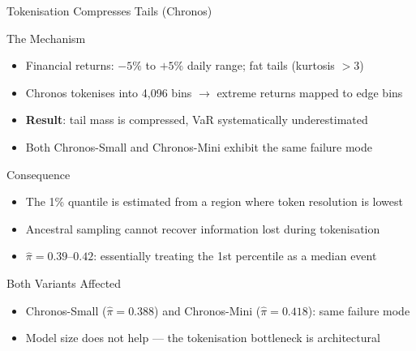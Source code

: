\documentclass[9pt, aspectratio=169, t]{beamer}
\begin{document}
\begin{frame}{Tokenisation Compresses Tails (Chronos)}
	\vspace{-0.3cm}
	{\footnotesize
	\begin{alertblock}{The Mechanism}
		\begin{itemize}\setlength{\itemsep}{1pt}
			\item Financial returns: $-5\%$ to $+5\%$ daily range; fat tails (kurtosis $> 3$)
			\item Chronos tokenises into 4{,}096 bins $\to$ extreme returns mapped to edge bins
			\item \textbf{Result}: tail mass is compressed, VaR systematically underestimated
			\item Both Chronos-Small and Chronos-Mini exhibit the same failure mode
		\end{itemize}
	\end{alertblock}
	\vspace{0mm}
	\begin{block}{Consequence}
		\begin{itemize}\setlength{\itemsep}{1pt}
			\item The 1\% quantile is estimated from a region where token resolution is lowest
			\item Ancestral sampling cannot recover information lost during tokenisation
			\item $\hat\pi = 0.39$--$0.42$: essentially treating the 1st percentile as a median event
		\end{itemize}
	\end{block}
	\vspace{0mm}
	\begin{alertblock}{Both Variants Affected}
		\begin{itemize}\setlength{\itemsep}{1pt}
			\item Chronos-Small ($\hat\pi = 0.388$) and Chronos-Mini ($\hat\pi = 0.418$): same failure mode
			\item Model size does not help --- the tokenisation bottleneck is architectural
		\end{itemize}
	\end{alertblock}
	}
\end{frame}
\end{document}
